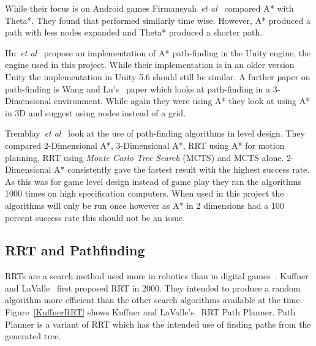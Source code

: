 \documentclass[journal]{IEEEtran}
\begin{document}
While their focus is on Android games Firmansyah~\textit{et al}~\cite{Firmansyah2016} compared A* with Theta*. They found that performed similarly time wise. However, A* produced a path with less nodes expanded and Theta* produced a shorter path. 

Hu~\textit{et al}~\cite{Hu2012} propose an implementation of A* path-finding in the Unity engine, the engine used in this project.  While their implementation is in an older version Unity the implementation in Unity 5.6 should still be similar. A further paper on path-finding is Wang and Lu's~\cite{wang2012} paper which looks at path-finding in a 3-Dimensional environment. While again they were using A* they look at using A* in 3D and suggest using nodes instead of a grid.

Tremblay~\textit{et al}~\cite{Tremblay2014} look at the use of path-finding algorithms in level design. They compared 2-Dimensional A*, 3-Dimensional A*, RRT using A* for motion planning, RRT using \textit{Monte Carlo Tree Search} (MCTS) and MCTS alone. 2-Dimensional A* consistently gave the fastest result with the highest success rate. As this was for game level design instead of game play they ran the algorithms 1000 times on high specification computers. When used in this project the algorithms will only be run once however as A* in 2 dimensions had a 100 percent success rate this should not be an issue. 

\subsection{RRT and Pathfinding} \label{RRTadnPathfinding}
RRTs are a search method used more in robotics than in digital games~\cite{LaValle1998,Kuffner2000}. Kuffner and LaValle~\cite{Kuffner2000} first proposed RRT in 2000. They intended to produce a random algorithm more efficient than the other search algorithms available at the time.  Figure~\ref{KuffnerRRT} shows Kuffner and LaValle's~\cite{Kuffner2000} RRT Path Planner. Path Planner is a variant of RRT which has the intended use of finding paths from the generated tree.
\end{document}
